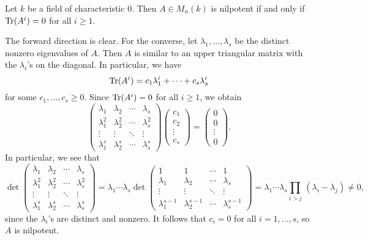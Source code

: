 \begin{theo}{}
    Let $k$ be a field of characteristic $0$. Then $A \in M_n(k)$ is 
    nilpotent if and only if $\operatorname{Tr}(A^i) = 0$ for all $i \geq 1$. 
\end{theo}
\begin{pf}
    The forward direction is clear. For the converse, let $\lambda_1, \dots, 
    \lambda_s$ be the distinct nonzero eigenvalues of $A$. Then $A$ is similar 
    to an upper triangular matrix with the $\lambda_i$'s on the diagonal. 
    In particular, we have 
    \[ \operatorname{Tr}(A^i) = c_1 \lambda_1^i + \cdots + c_s \lambda_s^i \] 
    for some $c_1, \dots, c_s \geq 0$. Since $\operatorname{Tr}(A^i) = 0$ for all $i \geq 1$, 
    we obtain 
    \[ \begin{pmatrix}
        \lambda_1 & \lambda_2 & \cdots & \lambda_s \\ 
        \lambda_1^2 & \lambda_2^2 & \cdots & \lambda_s^2 \\ 
        \vdots & \vdots & \ddots & \vdots \\ 
        \lambda_1^s & \lambda_2^s & \cdots & \lambda_s^s 
    \end{pmatrix} \begin{pmatrix}
        c_1 \\ c_2 \\ \vdots \\ c_s 
    \end{pmatrix} = \begin{pmatrix}
        0 \\ 0 \\ \vdots \\ 0
    \end{pmatrix}. \] 
    In particular, we see that 
    \[ \det\begin{pmatrix}
        \lambda_1 & \lambda_2 & \cdots & \lambda_s \\ 
        \lambda_1^2 & \lambda_2^2 & \cdots & \lambda_s^2 \\ 
        \vdots & \vdots & \ddots & \vdots \\ 
        \lambda_1^s & \lambda_2^s & \cdots & \lambda_s^s 
    \end{pmatrix} = \lambda_1 \cdots \lambda_s \det\begin{pmatrix}
        1 & 1 & \cdots & 1 \\ 
        \lambda_1 & \lambda_2 & \cdots & \lambda_s \\ 
        \vdots & \vdots & \ddots & \vdots \\ 
        \lambda_1^{s-1} & \lambda_2^{s-1} & \cdots & \lambda_s^{s-1} 
    \end{pmatrix} = \lambda_1 \cdots \lambda_s 
    \prod_{i>j}\,(\lambda_i - \lambda_j) \neq 0, \] 
    since the $\lambda_i$'s are distinct and nonzero. It follows that $c_i = 0$ 
    for all $i = 1, \dots, s$, so $A$ is nilpotent. 
\end{pf}

